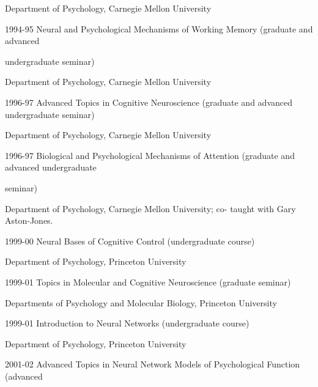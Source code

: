 \documentclass[10 pt]{article}
\begin{document}
\hspace{0.81in} Department of Psychology, Carnegie Mellon University
    \smallskip

1994-95 \hspace{0.3in} Neural and Psychological Mechanisms of Working Memory (graduate and advanced

\hspace{0.81in} undergraduate seminar)

\hspace{0.81in} Department of Psychology, Carnegie Mellon University
    \smallskip

1996-97 \hspace{0.3in} Advanced Topics in Cognitive Neuroscience (graduate and advanced undergraduate seminar)

\hspace{0.81in} Department of Psychology, Carnegie Mellon University
    \smallskip

1996-97 \hspace{0.3in} Biological and Psychological Mechanisms of Attention (graduate and advanced undergraduate

\hspace{0.81in} seminar)

\hspace{0.81in} Department of Psychology, Carnegie Mellon University; co-
taught with Gary Aston-Jones.
    \smallskip

1999-00 \hspace{0.3in} Neural Bases of Cognitive Control (undergraduate course)

\hspace{0.81in} Department of Psychology, Princeton University
    \smallskip

1999-01 \hspace{0.3in} Topics in Molecular and Cognitive Neuroscience (graduate seminar)

\hspace{0.81in} Departments of Psychology and Molecular Biology, Princeton University
    \smallskip

1999-01 \hspace{0.3in} Introduction to Neural Networks (undergraduate course)

\hspace{0.81in} Department of Psychology, Princeton University
    \smallskip

2001-02 \hspace{0.3in} Advanced Topics in Neural Network Models of Psychological Function (advanced
\end{document}
